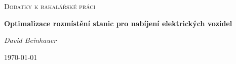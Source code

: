 
        



% 
\begin{titlepage}
	\centering
	\vspace{1cm}
	{\scshape\Large Dodatky k bakalářské práci\par}
	\vspace{1.5cm}
	{\huge\bfseries Optimalizace rozmístění stanic pro nabíjení elektrických vozidel\par}
	\vspace{2cm}
	{\Large\itshape David Beinhauer\par}
	\vfill

	\vfill

	{\large \today\par}
\end{titlepage}
% 